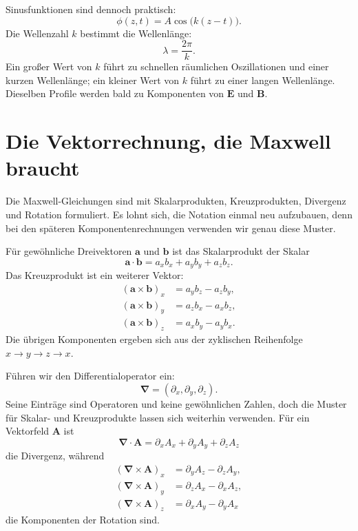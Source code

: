 Sinusfunktionen sind dennoch praktisch:
\begin{equation}
\phi(z,t)=A\cos\!\bigl(k(z-t)\bigr).
\end{equation}
Die Wellenzahl \(k\) bestimmt die Wellenlänge:
\begin{equation}
\lambda=\frac{2\pi}{k}.
\end{equation}
Ein großer Wert von \(k\) führt zu schnellen räumlichen Oszillationen und einer kurzen Wellenlänge; ein kleiner Wert von \(k\) führt zu einer langen Wellenlänge. Dieselben Profile werden bald zu Komponenten von \(\mathbf E\) und \(\mathbf B\).

\section{Die Vektorrechnung, die Maxwell braucht}

Die Maxwell-Gleichungen sind mit Skalarprodukten, Kreuzprodukten, Divergenz und Rotation formuliert. Es lohnt sich, die Notation einmal neu aufzubauen, denn bei den späteren Komponentenrechnungen verwenden wir genau diese Muster.

Für gewöhnliche Dreivektoren \(\mathbf a\) und \(\mathbf b\) ist das Skalarprodukt der Skalar
\begin{equation}
\mathbf a\cdot\mathbf b
=a_xb_x+a_yb_y+a_zb_z.
\end{equation}
Das Kreuzprodukt ist ein weiterer Vektor:
\begin{align}
(\mathbf a\times\mathbf b)_x&=a_yb_z-a_zb_y,\\
(\mathbf a\times\mathbf b)_y&=a_zb_x-a_xb_z,\\
(\mathbf a\times\mathbf b)_z&=a_xb_y-a_yb_x.
\end{align}
Die übrigen Komponenten ergeben sich aus der zyklischen Reihenfolge \(x\to y\to z\to x\).

Führen wir den Differentialoperator ein:
\begin{equation}
\boldsymbol\nabla=
\left(\partial_x,\partial_y,\partial_z\right).
\end{equation}
Seine Einträge sind Operatoren und keine gewöhnlichen Zahlen, doch die Muster für Skalar- und Kreuzprodukte lassen sich weiterhin verwenden. Für ein Vektorfeld \(\mathbf A\) ist
\begin{equation}
\boldsymbol\nabla\cdot\mathbf A
=\partial_xA_x+\partial_yA_y+\partial_zA_z
\label{eq:divergence}
\end{equation}
die Divergenz, während
\begin{align}
(\boldsymbol\nabla\times\mathbf A)_x
 &=\partial_yA_z-\partial_zA_y,\\
(\boldsymbol\nabla\times\mathbf A)_y
 &=\partial_zA_x-\partial_xA_z,\\
(\boldsymbol\nabla\times\mathbf A)_z
 &=\partial_xA_y-\partial_yA_x
\label{eq:curl}
\end{align}
die Komponenten der Rotation sind.

